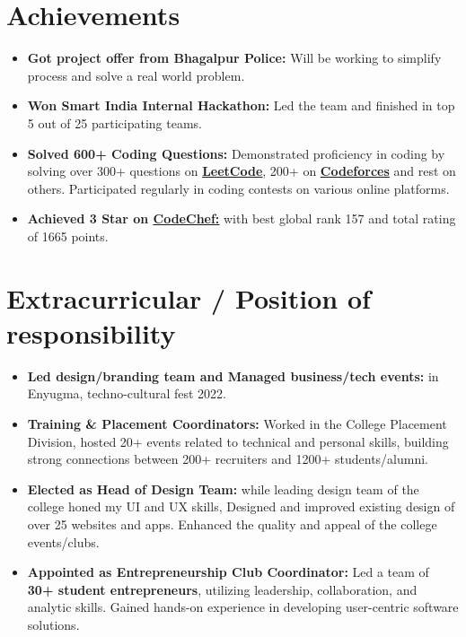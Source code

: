 \documentclass[letterpaper,11pt]{article}
\makeatletter
\newcommand{\resumeItem}[1]{
  \item\small{
    {#1 \vspace{-2pt}}
  }
}
\newcommand{\resumeSubheading}[4]{
  \vspace{-2pt}\item
    \begin{tabular*}{1.0\textwidth}[t]{l@{\extracolsep{\fill}}r}
      \textbf{#1} & \textbf{\small #2} \\
      \textit{\small#3} & \textit{\small #4} \\
    \end{tabular*}\vspace{-7pt}
}
\newcommand{\resumeSubHeadingListStart}{\begin{itemize}[leftmargin=0.0in, label={}]}
\newcommand{\resumeSubHeadingListEnd}{\end{itemize}}
\newcommand{\resumeItemListStart}{\begin{itemize}}
\newcommand{\resumeItemListEnd}{\end{itemize}\vspace{-5pt}}
\makeatother
\begin{document}
\section{Achievements}
    \resumeSubHeadingListStart
            \resumeItemListStart
                \resumeItem{\textbf{Got project offer from Bhagalpur Police:} Will be working to simplify process and solve a real world problem.}
                \resumeItem{\textbf{Won Smart India Internal Hackathon:} Led the team and finished in top 5 out of 25 participating teams.}
                \resumeItem{\textbf{Solved 600+ Coding Questions:} Demonstrated proficiency in coding by solving over 300+ questions on 
                {{\href{https://leetcode.com/rpremofficial/}{\color{MidnightBlue} \underline{\textbf{LeetCode}}}}}, 200+ on 
                {{\href{https://codeforces.com/profile/kr.prem}{\color{MidnightBlue} \underline{\textbf{Codeforces}}}}}
                and rest on others. Participated regularly in coding contests on various online platforms.}
                \resumeItem{\textbf{Achieved 3 Star on {{\href{https://www.codechef.com/users/rpremofficial}{\color{MidnightBlue} \underline{CodeChef:}}}}} with best global rank 157 and total rating of 1665 points.}
            \resumeItemListEnd
    \resumeSubHeadingListEnd
    \vspace{-13pt}


\section{Extracurricular / Position of responsibility}
    \resumeSubHeadingListStart
            \resumeItemListStart
                \resumeItem{\textbf{Led design/branding team and Managed business/tech events:} in Enyugma, techno-cultural fest 2022.}
                \resumeItem{\textbf{Training \& Placement Coordinators:} Worked in the College Placement Division, hosted 20+ events related to technical and personal skills, building strong connections between 200+ recruiters and 1200+ students/alumni.}
                \vspace{2pt}
                \resumeItem{\textbf{Elected as Head of Design Team:} while leading design team of the college honed my UI and UX skills, Designed and improved existing design of over 25 websites and apps. Enhanced the quality and appeal of the college events/clubs.}
                \vspace{2pt}
                \resumeItem{\textbf{Appointed as Entrepreneurship Club Coordinator:} Led a team of \textbf{30+ student entrepreneurs}, utilizing leadership, collaboration, and analytic skills. Gained hands-on experience in developing user-centric software solutions.}
            \resumeItemListEnd
        
    \resumeSubHeadingListEnd
\end{document}
